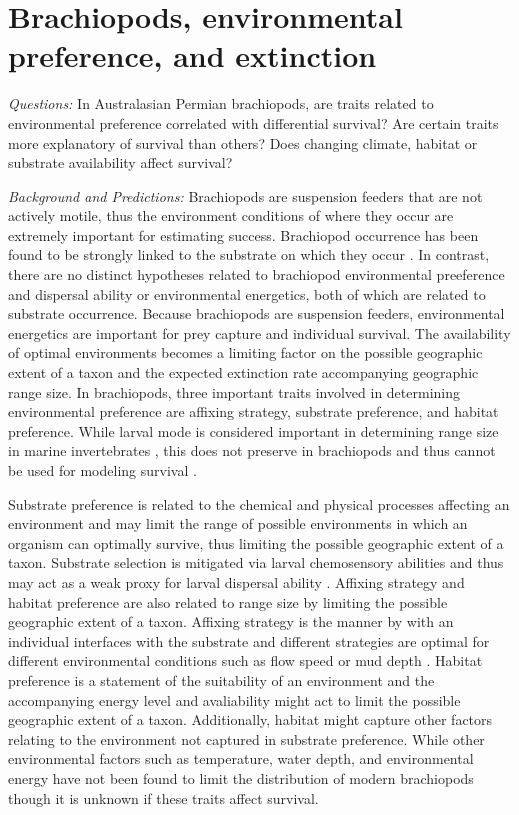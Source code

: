 \documentclass[12pt,letterpaper]{article}
\begin{document}
\section{Brachiopods, environmental preference, and extinction}

\textit{Questions:} In Australasian Permian brachiopods, are traits related to environmental preference correlated with differential survival? Are certain traits more explanatory of survival than others? Does changing climate, habitat or substrate availability affect survival?

\textit{Background and Predictions:}
Brachiopods are suspension feeders that are not actively motile, thus the environment conditions of where they occur are extremely important for estimating success. Brachiopod occurrence has been found to be strongly linked to the substrate on which they occur \citep{Richardson1997,Richardson1997a}. In contrast, there are no distinct hypotheses related to brachiopod environmental preeference and dispersal ability or environmental energetics, both of which are related to substrate occurrence. Because brachiopods are suspension feeders, environmental energetics are important for prey capture and individual survival. The availability of optimal environments becomes a limiting factor on the possible geographic extent of a taxon and the expected extinction rate accompanying geographic range size. In brachiopods, three important traits involved in determining environmental preference are affixing strategy, substrate preference, and habitat preference. While larval mode is considered important in determining range size in marine invertebrates \citep{Jablonski2006a,Jablonski1983}, this does not preserve in brachiopods and thus cannot be used for modeling survival \citep{Jablonski1983}. 

Substrate preference is related to the chemical and physical processes affecting an environment and may limit the range of possible environments in which an organism can optimally survive, thus limiting the possible geographic extent of a taxon. Substrate selection is mitigated via larval chemosensory abilities and thus may act as a weak proxy for larval dispersal ability \citep{Jablonski2006a,Jablonski1983}. Affixing strategy and habitat preference are also related to range size by limiting the possible geographic extent of a taxon. Affixing strategy is the manner by with an individual interfaces with the substrate and different strategies are optimal for different environmental conditions such as flow speed or mud depth \citep{Alexander1977,LaBarbera1978,LaBarbera1981}. Habitat preference is a statement of the suitability of an environment and the accompanying energy level and avaliability might act to limit the possible geographic extent of a taxon. Additionally, habitat might capture other factors relating to the environment not captured in substrate preference. While other environmental factors such as temperature, water depth, and environmental energy have not been found to limit the distribution of modern brachiopods \citep{Richardson1997,Richardson1997a} though it is unknown if these traits affect survival.
\end{document}
